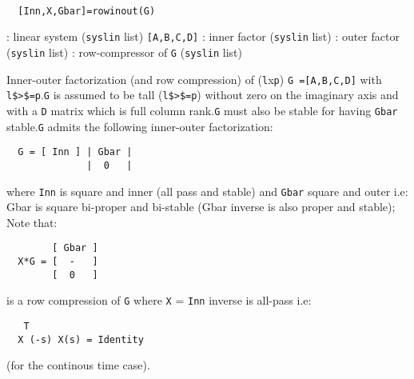 \begin{mandesc}
   \\ %
\end{mandesc}
\begin{calling_sequence}
\begin{verbatim}
  [Inn,X,Gbar]=rowinout(G)  
\end{verbatim}
\end{calling_sequence}
\begin{parameters}
  \begin{varlist}
    : linear system (\verb!syslin! list) \verb![A,B,C,D]!
    :  inner factor (\verb!syslin! list)
    :  outer factor (\verb!syslin! list)
    :  row-compressor of \verb!G! (\verb!syslin! list)
  \end{varlist}
\end{parameters}
\begin{mandescription}
  Inner-outer factorization (and row compression) of (\verb!l!x\verb!p!) \verb!G =[A,B,C,D]! with \verb!l$>$=p!.\verb!G! is assumed to be tall (\verb!l$>$=p!) without zero on the imaginary axis
  and with a \verb!D! matrix which is full column rank.\verb!G! must also be stable for having \verb!Gbar! stable.\verb!G! admits the following inner-outer factorization:
\begin{verbatim}
  G = [ Inn ] | Gbar |
              |  0   |
 \end{verbatim}
where \verb!Inn! is square and inner (all pass and stable) and \verb!Gbar! 
square and outer i.e:
Gbar is square bi-proper and bi-stable (Gbar inverse is also proper 
and stable);
Note that:
\begin{verbatim}
        [ Gbar ]
  X*G = [  -   ]
        [  0   ]
\end{verbatim}
is a row compression of \verb!G! where \verb!X! = \verb!Inn! inverse is all-pass i.e:
\begin{verbatim}
   T
  X (-s) X(s) = Identity
\end{verbatim}
(for the continous time case).
\end{mandescription}
\begin{manseealso}
     
\end{manseealso}
